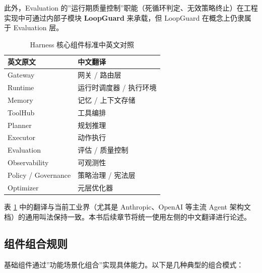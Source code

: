 此外，Evaluation 的”运行期质量控制”职能（死循环判定、无效策略终止）在工程实现中可通过内部子模块 \textbf{LoopGuard} 来承载，但 LoopGuard 在概念上仍隶属于 Evaluation 层。

\begin{table}[htbp]
\centering
\caption{Harness 核心组件标准中英文对照}
\label{tab:terminology}
\begin{tabular}{@{}ll@{}}
\toprule
\textbf{英文原文} & \textbf{中文翻译} \\
\midrule
Gateway & 网关 / 路由层 \\
Runtime & 运行时调度器 / 执行环境 \\
Memory & 记忆 / 上下文存储 \\
ToolHub & 工具编排 \\
Planner & 规划推理 \\
Executor & 动作执行 \\
Evaluation & 评估 / 质量控制 \\
Observability & 可观测性 \\
Policy / Governance & 策略治理 / 宪法层 \\
Optimizer & 元层优化器 \\
\bottomrule
\end{tabular}
\end{table}

表 \ref{tab:terminology} 中的翻译与当前工业界（尤其是 Anthropic、OpenAI 等主流 Agent 架构文档）的通用叫法保持一致。本书后续章节将统一使用左侧的中文翻译进行论述。

\subsection{组件组合规则}

基础组件通过”功能场景化组合”实现具体能力。以下是几种典型的组合模式：

